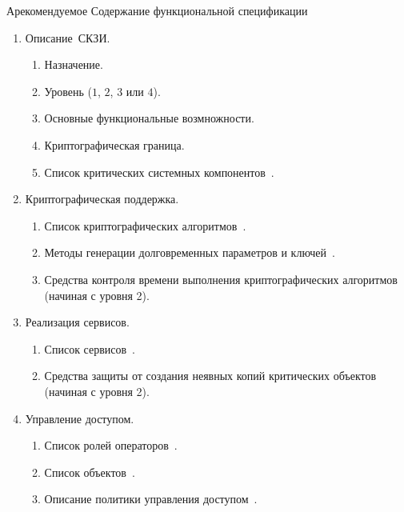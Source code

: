 \begin{appendix}{А}{рекомендуемое}
{Содержание функциональной спецификации}\label{SPEC}

\mbox{}

\begin{enumerate}
\item
{Описание~СКЗИ.}

\begin{enumerate}
\item
Назначение.
\item
Уровень ($1$, $2$, $3$ или $4$).
\item
Основные функциональные возмножности.
\item
Криптографическая граница.
\item
Список критических системных компонентов~.
\end{enumerate}

\item
{Криптографическая поддержка.}

\begin{enumerate}
\item
Список криптографических алгоритмов~.

\item
Методы генерации долговременных параметров и ключей~.

\item
Средства контроля времени выполнения криптографических 
алгоритмов~ (начиная с уровня 2). 
\end{enumerate}

\item
{Реализация сервисов.}
\begin{enumerate}
\item
Список сервисов~.

\item
Средства защиты от создания неявных копий
критических объектов~ 
(начиная с уровня 2).
\end{enumerate}

\item
{Управление доступом.}

\begin{enumerate}
\item
Список ролей операторов~.

\item
Список объектов~.

\item
Описание политики управления доступом~.


\end{enumerate}
\end{enumerate}
\end{appendix}
